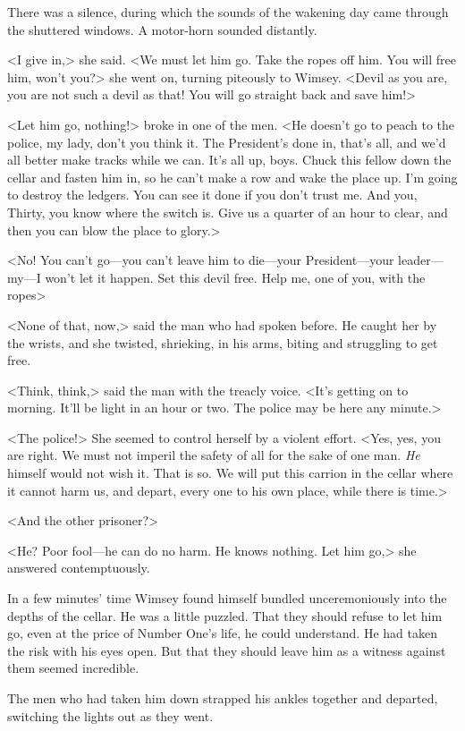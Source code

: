 There was a silence, during which the sounds of the wakening day came through the shuttered windows. A motor-horn sounded distantly.

<I give in,> she said. <We must let him go. Take the ropes off him. You will free him, won't you?> she went on, turning piteously to Wimsey. <Devil as you are, you are not such a devil as that! You will go straight back and save him!>

<Let him go, nothing!> broke in one of the men. <He doesn't go to peach to the police, my lady, don't you think it. The President's done in, that's all, and we'd all better make tracks while we can. It's all up, boys. Chuck this fellow down the cellar and fasten him in, so he can't make a row and wake the place up. I'm going to destroy the ledgers. You can see it done if you don't trust me. And you, Thirty, you know where the switch is. Give us a quarter of an hour to clear, and then you can blow the place to glory.>

<No! You can't go—you can't leave him to die—your President—your leader—my—I won't let it happen. Set this devil free. Help me, one of you, with the ropes\longdash>

<None of that, now,> said the man who had spoken before. He caught her by the wrists, and she twisted, shrieking, in his arms, biting and struggling to get free.

<Think, think,> said the man with the treacly voice. <It's getting on to morning. It'll be light in an hour or two. The police may be here any minute.>

<The police!> She seemed to control herself by a violent effort. <Yes, yes, you are right. We must not imperil the safety of all for the sake of one man. \emph{He} himself would not wish it. That is so. We will put this carrion in the cellar where it cannot harm us, and depart, every one to his own place, while there is time.>

<And the other prisoner?>

<He? Poor fool—he can do no harm. He knows nothing. Let him go,> she answered contemptuously.

In a few minutes' time Wimsey found himself bundled unceremoniously into the depths of the cellar. He was a little puzzled. That they should refuse to let him go, even at the price of Number One's life, he could understand. He had taken the risk with his eyes open. But that they should leave him as a witness against them seemed incredible.

The men who had taken him down strapped his ankles together and departed, switching the lights out as they went.

